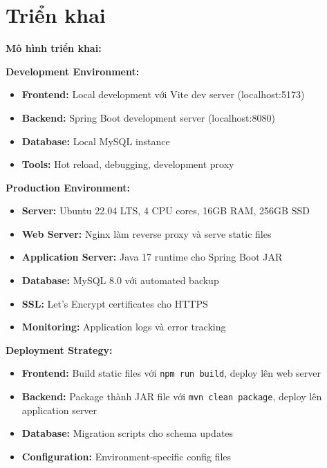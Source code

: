 \documentclass[../DoAn.tex]{subfiles}
\begin{document}

\section{Triển khai}

\textbf{Mô hình triển khai:}

\textbf{Development Environment:}
\begin{itemize}
    \item \textbf{Frontend:} Local development với Vite dev server (localhost:5173)
    \item \textbf{Backend:} Spring Boot development server (localhost:8080)
    \item \textbf{Database:} Local MySQL instance
    \item \textbf{Tools:} Hot reload, debugging, development proxy
\end{itemize}

\textbf{Production Environment:}
\begin{itemize}
    \item \textbf{Server:} Ubuntu 22.04 LTS, 4 CPU cores, 16GB RAM, 256GB SSD
    \item \textbf{Web Server:} Nginx làm reverse proxy và serve static files
    \item \textbf{Application Server:} Java 17 runtime cho Spring Boot JAR
    \item \textbf{Database:} MySQL 8.0 với automated backup
    \item \textbf{SSL:} Let's Encrypt certificates cho HTTPS
    \item \textbf{Monitoring:} Application logs và error tracking
\end{itemize}

\textbf{Deployment Strategy:}
\begin{itemize}
    \item \textbf{Frontend:} Build static files với \texttt{npm run build}, deploy lên web server
    \item \textbf{Backend:} Package thành JAR file với \texttt{mvn clean package}, deploy lên application server
    \item \textbf{Database:} Migration scripts cho schema updates
    \item \textbf{Configuration:} Environment-specific config files
\end{itemize}
\end{document}
